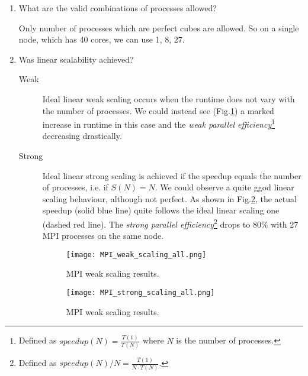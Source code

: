 \documentclass{article}
\begin{document}
\begin{enumerate}
	\item What are the valid combinations of processes allowed?

	Only number of processes which are perfect cubes are allowed. So on a single node, which has 40 cores, we can use 1, 8, 27.

	\item Was linear scalability achieved?


	\begin{description}
		\item[Weak]
		Ideal linear weak scaling occurs when the runtime does not vary with the number of processes. We could instead see (Fig.\ref{fig:MPI_weakScaling}) a marked increase in runtime in this case and the \emph{weak parallel efficiency}\footnote{Defined as $speedup(N) = \frac{T(1)}{T(N)}$ where $N$ is the number of processes.} decreasing drastically.

		\item[Strong]
		Ideal linear strong scaling is achieved if the speedup equals the number of processes, i.e. if $S(N) = N$. We could observe a quite ggod linear scaling behaviour, although not perfect. As shown in Fig.\ref{fig:MPI_strongScaling}, the actual speedup (solid blue line) quite follows the ideal linear scaling one (dashed red line). The \emph{strong parallel efficiency}\footnote{Defined as $speedup(N)/N = \frac{T(1)}{N \cdot T(N)}$.} drops to $80\%$ with 27 MPI processes on the same node.

		\begin{figure}[p] %
		 	\begin{center}
		 		\texttt{[image: MPI\_weak\_scaling\_all.png]} %
		 		\caption{MPI weak scaling results.}
		 		\label{fig:MPI_weakScaling}
		 	\end{center}
		\end{figure}
		\begin{figure}[p] %
		 	\begin{center}
		 		\texttt{[image: MPI\_strong\_scaling\_all.png]} %
		 		\caption{MPI weak scaling results.}
		 		\label{fig:MPI_strongScaling}
		 	\end{center}
		\end{figure}
	\end{description}


\end{enumerate}
\end{document}

